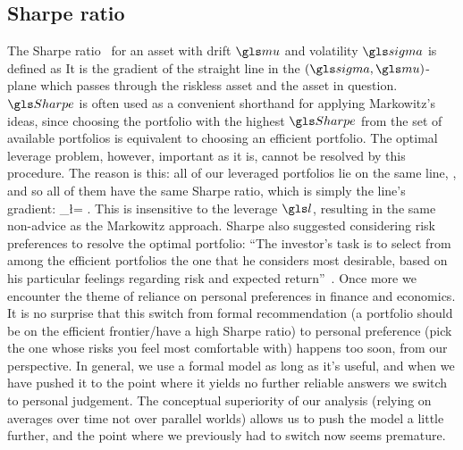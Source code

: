 \subsection{Sharpe ratio}
The Sharpe ratio~\cite{Sharpe1966} for an asset with drift $\gmu$ and volatility $\gsigma$ is defined as
\be
\Sharpe\equiv\frac{\gmu-\mur}{\gsigma}
\ee
It is the gradient of the straight line in the $(\gsigma, \gmu)$-plane which passes through the riskless asset and the asset in question. $\Sharpe$ is often used as a convenient shorthand for applying Markowitz's ideas, since choosing the portfolio with the highest $\Sharpe$ from the set of available portfolios is equivalent to choosing an efficient portfolio. The optimal leverage problem, however, important as it is, cannot be resolved by this procedure. The reason is this: all of our leveraged portfolios lie on the same line, , and so all of them have the same Sharpe ratio, which is simply the line's gradient:
\be
\Sharpe_\l = \frac{\mue}{\sigmas}.
\ee
This is insensitive to the leverage $\l$, resulting in the same non-advice as the Markowitz approach. Sharpe also suggested considering risk preferences to resolve the optimal portfolio: ``The investor's task is to select from among the efficient portfolios the one that he considers most desirable, based on his particular feelings regarding risk and expected return''~\cite{Sharpe1966}. Once more we encounter the theme of reliance on personal preferences in finance and economics. It is no surprise that this switch from formal recommendation (a portfolio should be on the efficient frontier/have a high Sharpe ratio) to personal preference (pick the one whose risks you feel most comfortable with) happens too soon, from our perspective. In general, we use a formal model as long as it's useful, and when we have pushed it to the point where it yields no further reliable answers we switch to personal judgement. The conceptual superiority of our analysis (relying on averages over time not over parallel worlds) allows us to push the model a little further, and the point where we previously had to switch now seems premature. 

